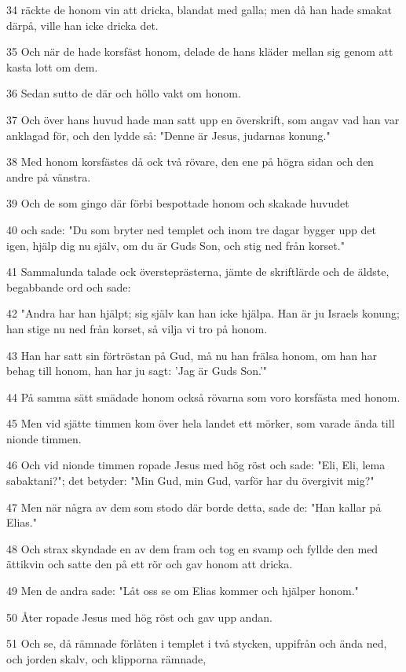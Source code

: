\par 34 räckte de honom vin att dricka, blandat med galla; men då han hade smakat därpå, ville han icke dricka det.
\par 35 Och när de hade korsfäst honom, delade de hans kläder mellan sig genom att kasta lott om dem.
\par 36 Sedan sutto de där och höllo vakt om honom.
\par 37 Och över hans huvud hade man satt upp en överskrift, som angav vad han var anklagad för, och den lydde så: "Denne är Jesus, judarnas konung."
\par 38 Med honom korsfästes då ock två rövare, den ene på högra sidan och den andre på vänstra.
\par 39 Och de som gingo där förbi bespottade honom och skakade huvudet
\par 40 och sade: "Du som bryter ned templet och inom tre dagar bygger upp det igen, hjälp dig nu själv, om du är Guds Son, och stig ned från korset."
\par 41 Sammalunda talade ock översteprästerna, jämte de skriftlärde och de äldste, begabbande ord och sade:
\par 42 "Andra har han hjälpt; sig själv kan han icke hjälpa. Han är ju Israels konung; han stige nu ned från korset, så vilja vi tro på honom.
\par 43 Han har satt sin förtröstan på Gud, må nu han frälsa honom, om han har behag till honom, han har ju sagt: 'Jag är Guds Son.'"
\par 44 På samma sätt smädade honom också rövarna som voro korsfästa med honom.
\par 45 Men vid sjätte timmen kom över hela landet ett mörker, som varade ända till nionde timmen.
\par 46 Och vid nionde timmen ropade Jesus med hög röst och sade: "Eli, Eli, lema sabaktani?"; det betyder: "Min Gud, min Gud, varför har du övergivit mig?"
\par 47 Men när några av dem som stodo där borde detta, sade de: "Han kallar på Elias."
\par 48 Och strax skyndade en av dem fram och tog en svamp och fyllde den med ättikvin och satte den på ett rör och gav honom att dricka.
\par 49 Men de andra sade: "Låt oss se om Elias kommer och hjälper honom."
\par 50 Åter ropade Jesus med hög röst och gav upp andan.
\par 51 Och se, då rämnade förlåten i templet i två stycken, uppifrån och ända ned, och jorden skalv, och klipporna rämnade,
